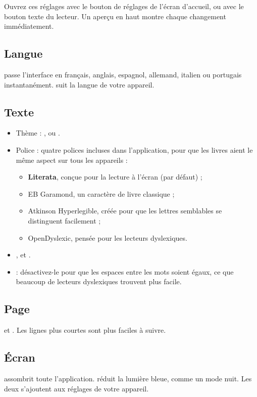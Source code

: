 \documentclass[11pt]{article}
\begin{document}
Ouvrez ces réglages avec le bouton de réglages de l’écran d’accueil, ou avec le bouton texte du
lecteur. Un aperçu en haut montre chaque changement immédiatement.


\subsection{Langue}
 passe l’interface en français, anglais, espagnol, allemand, italien
ou portugais instantanément.  suit la langue de votre appareil.

\subsection{Texte}
\begin{itemize}
  \item Thème : ,  ou .
  \item Police : quatre polices incluses dans l’application, pour que les livres aient le même
        aspect sur tous les appareils :
  \begin{itemize}
    \item \textbf{Literata}, conçue pour la lecture à l’écran (par défaut) ;
    \item {\garamondfont EB Garamond}, un caractère de livre classique ;
    \item {\sffamily Atkinson Hyperlegible}, créée pour que les lettres semblables se distinguent
          facilement ;
    \item {\dyslexicfont OpenDyslexic}, pensée pour les lecteurs dyslexiques.
  \end{itemize}
  \item {},  et .
  \item {} : désactivez-le pour que les espaces entre les mots soient égaux,
        ce que beaucoup de lecteurs dyslexiques trouvent plus facile.
\end{itemize}

\subsection{Page}
 et . Les lignes plus courtes sont plus faciles à suivre.

\subsection{Écran}
 assombrit toute l’application.  réduit la lumière bleue, comme un mode
nuit. Les deux s’ajoutent aux réglages de votre appareil.
\end{document}
